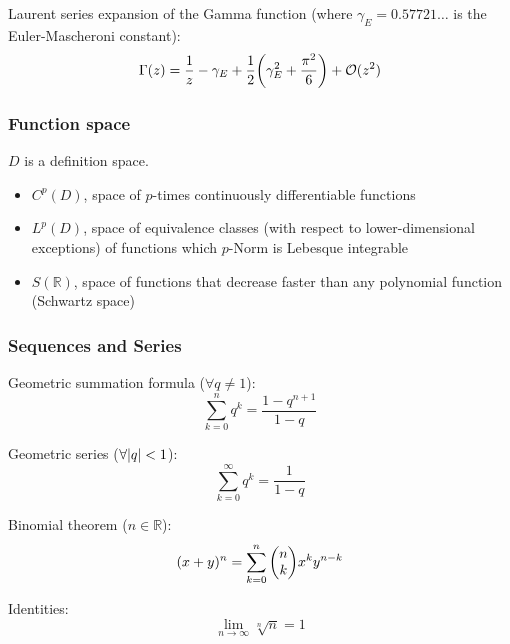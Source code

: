 			\noindent
			Laurent series expansion of the Gamma function (where $\gamma_E=0.57721\dots$ is the Euler-Mascheroni constant):
			\begin{equation}
				\Gamma(z) = \frac{1}{z} - \gamma_E + \frac{1}{2}\qty(\gamma_E^2 + \frac{\pi^2}{6}) +\mathcal{O}(z^2)
			\end{equation}


		\subsubsection{Function space}
			\noindent
			$D$ is a definition space.
			\begin{itemize}
				\item $C^p(D)$, space of $p$-times continuously differentiable functions
				\item $L^p(D)$, space of equivalence classes (with respect to lower-dimensional exceptions) of functions which $p$-Norm is Lebesque integrable
				\item $S(\mathbb{R})$, space of functions that decrease faster than any polynomial function (Schwartz space)
			\end{itemize}

		\subsubsection{Sequences and Series}
			\noindent
			Geometric summation formula ($\forall q \ne 1$):
			\begin{equation}
				\sum_{k=0}^n q^k=\frac{1-q^{n+1}}{1-q}
			\end{equation}

			\noindent
			Geometric series ($\forall \abs{q} < 1$):
			\begin{equation}
				\sum_{k=0}^\infty q^k= \frac{1}{1-q}
			\end{equation}

			\noindent
			Binomial theorem ($n\in\mathbb{R}$):
			\begin{equation}
				(x+y)^n=\sum_{k=0}^{n}\binomkoeff{n}{k}x^k y^{n-k}
			\end{equation}

			\noindent
			Identities:
			\begin{equation}
				\lim_{n\rightarrow\infty} \sqrt[n]{n} = 1
			\end{equation}

